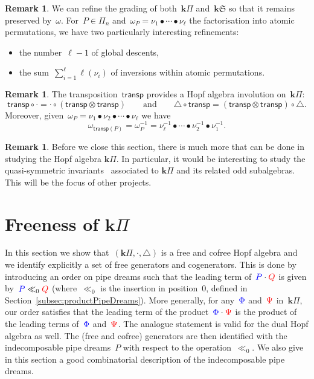 \documentclass{amsart}
\theoremstyle{definition}
\newtheorem{remark}[theorem]{Remark}
\newcommand{\bk}{\mathbf{k}} %
\renewcommand{\b}[1]{{\color{blue} #1}} %
\renewcommand{\r}[1]{{\color{red} #1}} %
\newcommand{\fS}{\mathfrak{S}} %
\newcommand{\gdproduct}{\bullet} %
\newcommand{\HS}{{\bk\fS}} %
\newcommand{\transpose}{\mathsf{transp}}
\newcommand{\pipeDreams}{\Pi} %
\newcommand{\HP}{{\bk\pipeDreams}} %
\newcommand{\gammainsertion}{\ll}  %
\newcommand{\product}{\cdot} %
\newcommand{\coproduct}{\triangle} %
\begin{document}
\begin{remark}
We can refine the grading of both~$\HP$ and~$\HS$ so that it remains preserved by~$\omega$.
For~${P \in \pipeDreams_n}$ and~$\omega_P = \nu_1 \gdproduct \cdots \gdproduct \nu_\ell$ the factorisation into atomic permutations, we have two particularly interesting refinements:
\begin{itemize}
\item the number~$\ell-1$ of global descents,
\item the sum~$\displaystyle \sum_{i=1}^\ell \ell(\nu_i)$ of inversions within atomic permutations.
\end{itemize}
\end{remark}

\begin{remark}
The transposition~$\transpose$ provides a Hopf algebra involution on~$\HP$:
\[
\transpose \circ \product = \product \circ (\transpose \otimes \transpose)
\qquad\text{and}\qquad
\coproduct \circ \transpose = (\transpose \otimes \transpose) \circ \coproduct.
\]
Moreover, given~$\omega_P = \nu_1 \gdproduct \nu_2 \gdproduct \cdots \gdproduct \nu_\ell$ we have
\[
\omega_{\transpose(P)} = \omega_P^{-1} = \nu_\ell^{-1} \gdproduct \cdots \gdproduct \nu_2^{-1} \gdproduct \nu_1^{-1}.
\]
\end{remark}


\begin{remark}
Before we close this section, there is much more that can be done in studying the Hopf algebra  $\HP$. In particular, it would be interesting to study the quasi-symmetric invariants~\cite{AguiarBergeronSottile} associated to 
$\HP$ and its related odd subalgebras. This will be the focus of other projects.
\end{remark}


\section{Freeness of $\HP$}
\label{sec:freeness}

In this section we show that~$(\HP, \product, \coproduct)$ is a free and cofree Hopf algebra and we identify explicitly a set of free generators and cogenerators. This is done by introducing an order on pipe dreams such that the leading term of~${\b{P} \product \r{Q}}$ is given by~${\b{P} \gammainsertion_0 \r{Q}}$ (where~$\gammainsertion_0$ is the insertion in position~$0$, defined in Section~\ref{subsec:productPipeDreams}). More generally, for any~$\b{\Phi}$ and~$\r{\Psi}$ in~$\HP$, our order satisfies that the leading term of the product~${\b{\Phi} \product \r{\Psi}}$ is the product of the leading terms of~$\b{\Phi}$ and~$\r{\Psi}$. The analogue statement is valid for the dual Hopf algebra as well. The (free and cofree) generators are then identified with the indecomposable pipe dreams~$P$ with respect to the operation~$\gammainsertion_0$. We also give in this section a good combinatorial description of the indecomposable pipe dreams.
\end{document}
